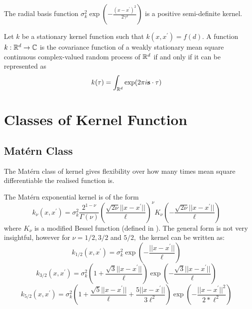 \color{red}

\begin{theorem}\label{thm:rbf_pos_def}
    The radial basis function
    ${\sigma^2_k}\exp(-\frac{(x - x^\prime)^2}{2\gamma^2})$ is a positive
    semi-definite kernel.
\end{theorem}

\begin{theorem}
    Let $k$ be a stationary kernel function such that
    $k(x, x^\prime) = f(d)$. A function $k:\mathbb{R}^d\to\mathbb{C}$ is the covariance
    function of a weakly
    stationary mean square continuous complex-valued random process of $\mathbb{R}^d$
    if and only if it can be represented as
    $$k(\mathbf{\tau}) = \int_{\mathbb{R}^d} \exp(2\pi i \mathbf{s}\cdot\mathbf{\tau})$$
\end{theorem}

\parencite[82]{rasmussen_gaussian_2008}

\color{black}

\section{Classes of Kernel Function}

\subsection*{Mat\'{e}rn Class}

The Mat\'ern class of kernel gives flexibility over how many times mean square
differentiable the realised function is.

The Mat\'ern exponential kernel is of the form
$$k_\nu(x, x^\prime)
    = \sigma^2_k \frac{2^{1 - \nu}}{\Gamma(\nu)}
    \left(\frac{\sqrt{2\nu}||x - x^\prime||}{\ell}\right)^\nu
    K_\nu\left(-\frac{\sqrt{2\nu}||x - x^\prime||}{\ell}\right)$$
where $K_\nu$ is a modified Bessel function
(defined in \cite[374]{abramowitz_handbook_2013}). The general form is not very
insightful, however for $\nu = 1/2, 3/2$ and $5/2,$ the kernel
can be written as:
$$
    k_{1/2}(x, x^\prime)
    = \sigma^2_k\exp\left(-\frac{||x - x^\prime||}{\ell}\right)
$$
$$
    k_{3/2}(x, x^\prime)
    = \sigma^2_k
    \left(1 + \frac{\sqrt{3}||x - x^\prime||}{\ell}\right)
    \exp\left(-\frac{\sqrt{3}||x - x^\prime||}{\ell}\right)
$$
$$
    k_{5/2}(x, x^\prime)
    = \sigma^2_k
    \left(
    1 + \frac{\sqrt{5}||x - x^\prime||}{\ell} + \frac{5||x - x^\prime||}{3\ell^2}
    \right)
    \exp\left(-\frac{||x - x^\prime||^2}{2*\ell^2}\right)
$$

